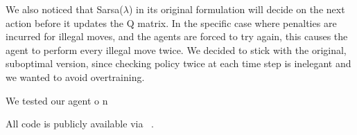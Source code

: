 We also noticed that Sarsa($\lambda$) in its original formulation will decide on the next action before it updates the Q matrix. In the specific case where penalties are incurred for illegal moves, and the agents are forced to try again, this causes the agent to perform every illegal move twice. We decided to stick with the original, suboptimal version, since checking policy twice at each time step is inelegant and we wanted to avoid overtraining.

We tested our agent o n

All code is publicly available via ~\cite{githubrepo}.
